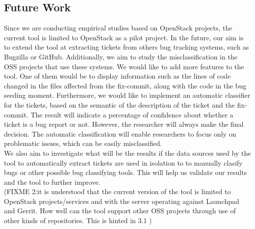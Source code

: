 \documentclass[runningheads,a4paper]{llncs}
\begin{document}
\subsection{Future Work}
\label{sec:5.1}

Since we are conducting empirical studies based on OpenStack projects, the current tool is limited to OpenStack as a pilot project. In the future, our aim is to extend the tool at extracting tickets from others bug tracking systems, such as Bugzilla or GitHub. Additionally, we aim to study the misclassification in the OSS projects that use these systems. We would like to add more features to the tool. One of them would be to display information such as the lines of code changed in the files affected from the fix-commit, along with the code in the bug seeding moment. Furthermore, we would like to implement an automatic classifier for the tickets, based on the semantic of the description of the ticket and the fix-commit. The result will indicate a percentage of confidence about whether a ticket is a bug report or not. However, the researcher will always make the final decision. The automatic classification will enable researchers to focus only on problematic issues, which can be easily misclassified. \\

We also aim to investigate what will be the results if the data sources used by the tool to automatically extract tickets are used in isolation to to manually clasify bugs or other possible bug classifying tools. This will help us validate our results and the tool to further improve.\\

(FIXME 2:it is understood that the current version of the tool is limited to OpenStack projects/services and with the server operating against Launchpad and Gerrit. How well can the tool support other OSS projects through use of other kinds of repositories. This is hinted in 3.1 )\\
\end{document}
